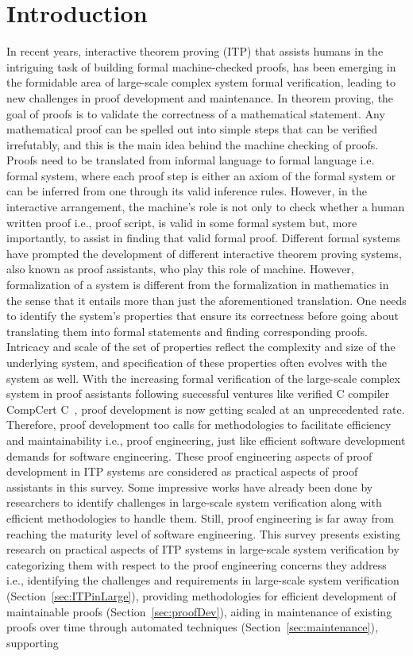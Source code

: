 \section{Introduction}
\label{sec:intro}

In recent years, interactive theorem proving (ITP) that assists humans in the intriguing task of building formal machine-checked proofs, has been emerging in the formidable area of large-scale complex system formal verification, leading to new challenges in proof development and maintenance. In theorem proving, the goal of proofs is to validate the correctness of a mathematical statement. Any mathematical proof can be spelled out into simple steps that can be verified irrefutably, and this is the main idea behind the machine checking of proofs. Proofs need to be translated from informal language to formal language i.e. formal system, where each proof step is either an axiom of the formal system or can be inferred from one through its valid inference rules. However, in the interactive arrangement, the machine's role is not only to check whether a human written proof i.e., proof script, is valid in some formal system but, more importantly, to assist in finding that valid formal proof. Different formal systems have prompted the development of different interactive theorem proving systems, also known as proof assistants, who play this role of machine. However, formalization of a system is different from the formalization in mathematics in the sense that it entails more than just the aforementioned translation. One needs to identify the system's properties that ensure its correctness before going about translating them into formal statements and finding corresponding proofs. Intricacy and scale of the set of properties reflect the complexity and size of the underlying system, and specification of these properties often evolves with the system as well. With the increasing formal verification of the large-scale complex system in proof assistants following successful ventures like verified C compiler CompCert C~\cite{Leroy_2006}, proof development is now getting scaled at an unprecedented rate. Therefore, proof development too calls for methodologies to facilitate efficiency and maintainability i.e., proof engineering, just like efficient software development demands for software engineering. These proof engineering aspects of proof development in ITP systems are considered as practical aspects of proof assistants in this survey. Some impressive works have already been done by researchers to identify challenges in large-scale system verification along with efficient methodologies to handle them. Still, proof engineering is far away from reaching the maturity level of software engineering. This survey presents existing research on practical aspects of ITP systems in large-scale system verification by categorizing them with respect to the proof engineering concerns they address i.e., identifying the challenges and requirements in large-scale system verification (Section~\ref{sec:ITPinLarge}), providing methodologies for efficient development of maintainable proofs (Section~\ref{sec:proofDev}), aiding in maintenance of existing proofs over time through automated techniques (Section~\ref{sec:maintenance}), supporting 